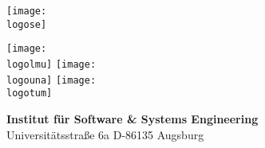 \documentclass[\myrootdir/main.tex]{subfiles}
\begin{document}
\begin{titlepage}
\centering

\texttt{[image: \\logose]}

\vspace{1cm}

{\Large \myThesisType}

\vfill

\begin{spacing}{1.1}
\Huge \bfseries \myTitle
\end{spacing}

\vspace{1.5em}

{\Large \myAuthor}

\vfill

\texttt{[image: \\logolmu]} \hspace{1cm}
\texttt{[image: \\logouna]} \hspace{1cm}
\texttt{[image: \\logotum]}

\vspace{8mm}
{\Large
{\bfseries Institut für Software \& Systems Engineering}\\
Universitätsstraße 6a \hspace{0.25cm} D-86135 Augsburg\\
}

\cleardoublepage
\end{titlepage}
\end{document}
